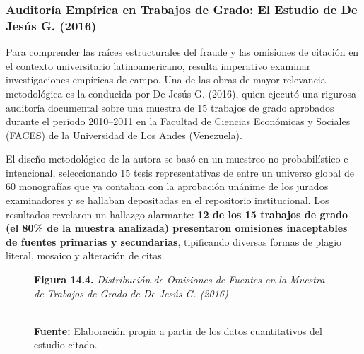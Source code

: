 \subsubsection{Auditoría Empírica en Trabajos de Grado: El Estudio de De Jesús G. (2016)}

Para comprender las raíces estructurales del fraude y las omisiones de citación en el contexto universitario latinoamericano, resulta imperativo examinar investigaciones empíricas de campo. Una de las obras de mayor relevancia metodológica es la conducida por De Jesús G. (2016), quien ejecutó una rigurosa auditoría documental sobre una muestra de 15 trabajos de grado aprobados durante el período 2010--2011 en la Facultad de Ciencias Económicas y Sociales (FACES) de la Universidad de Los Andes (Venezuela).

El diseño metodológico de la autora se basó en un muestreo no probabilístico e intencional, seleccionando 15 tesis representativas de entre un universo global de 60 monografías que ya contaban con la aprobación unánime de los jurados examinadores y se hallaban depositadas en el repositorio institucional. Los resultados revelaron un hallazgo alarmante: \textbf{12 de los 15 trabajos de grado (el 80\% de la muestra analizada) presentaron omisiones inaceptables de fuentes primarias y secundarias}, tipificando diversas formas de plagio literal, mosaico y alteración de citas.

\begin{figure}[htbp]
\centering
\begin{tcolorbox}[colback=white, colframe=unmsm_gold, arc=3pt, boxrule=0.8pt, top=0.3cm, bottom=0.3cm, left=0.4cm, right=0.4cm]
\centering
\small\sffamily
\textbf{Figura 14.4.} \textit{Distribución de Omisiones de Fuentes en la Muestra de Trabajos de Grado de De Jesús G. (2016)}\\[0.25cm]
\\[0.2cm]
\raggedright
\scriptsize \textbf{Fuente:} Elaboración propia a partir de los datos cuantitativos del estudio citado.
\end{tcolorbox}
\end{figure}

